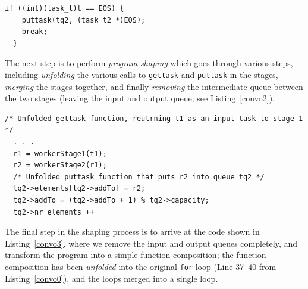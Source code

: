 \begin{lstlisting}[label=convo1, caption={Convolution, Repaired with a Termination Token}]
  if ((int)(task_t)t == EOS) {
    puttask(tq2, (task_t2 *)EOS);
    break;
  }
  \end{lstlisting}


\noindent
The next step is to perform \emph{program shaping} which goes through various steps, including \emph{unfolding} the various calls to \lstinline{gettask} and \lstinline{puttask} in the stages, \emph{merging} the stages together, and finally \emph{removing} the intermediate queue between the two stages (leaving the input and output queue; see Listing~\ref{convo2}). 

\begin{lstlisting}[label=convo2, caption={Stages merged, unfolded and intermediate queue removed}]
  /* Unfolded gettask function, reutrning t1 as an input task to stage 1 */
  . . .
  r1 = workerStage1(t1);
  r2 = workerStage2(r1);
  /* Unfolded puttask function that puts r2 into queue tq2 */
  tq2->elements[tq2->addTo] = r2;
  tq2->addTo = (tq2->addTo + 1) % tq2->capacity;
  tq2->nr_elements ++
\end{lstlisting}

\noindent
The final step in the shaping process is to arrive at the code shown in Listing~\ref{convo3}, where we remove the input and output queues completely, and transform the program into a simple function composition; the function composition has been \emph{unfolded} into the original \lstinline{for} loop (Line 37--40 from Listing~\ref{convo0}), and the loops merged into a single loop. 


